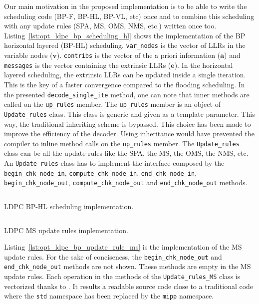 Our main motivation in the proposed implementation is to be able to write the
scheduling code (BP-F, BP-HL, BP-VL, etc) once and to combine this scheduling
with any update rules (SPA, MS, OMS, NMS, etc.) written once too.
Listing~\ref{lst:opt_ldpc_bp_scheduling_hl} shows the implementation of the
BP horizontal layered (BP-HL) scheduling. \verb|var_nodes| is the vector of
LLRs in the variable nodes ($\bm{v}$). \verb|contribs| is the vector of the a
priori information ($\bm{a}$) and \verb|messages| is the vector containing the
extrinsic LLRs ($\bm{e}$). In the horizontal layered scheduling, the
extrinsic LLRs can be updated inside a single iteration. This is the key of a
faster convergence compared to the flooding scheduling. In the presented
\verb|decode_single_ite| method, one can note that inner methods are called on
the \verb|up_rules| member. The \verb|up_rules| member is an object of
\verb|Update_rules| class. This class is generic and given as a template
parameter. This way, the traditional inheriting scheme is bypassed. This choice
has been made to improve the efficiency of the decoder. Using inheritance would
have prevented the compiler to inline method calls on the \verb|up_rules|
member. The \verb|Update_rules| class can be all the update rules like the SPA,
the MS, the OMS, the NMS, etc. An \verb|Update_rules| class has to implement the
interface composed by the \verb|begin_chk_node_in|, \verb|compute_chk_node_in|,
\verb|end_chk_node_in|, \verb|begin_chk_node_out|, \verb|compute_chk_node_out|
and \verb|end_chk_node_out| methods.

\begin{listing}[htp]
  \inputminted[frame=lines,linenos]{C++}{main/chapter3/src/ldpc/bp_scheduling_hl.cpp}
  \caption{LDPC BP-HL scheduling implementation.}
  \label{lst:opt_ldpc_bp_scheduling_hl}
\end{listing}

\begin{listing}[htp]
  \inputminted[frame=lines,linenos]{C++}{main/chapter3/src/ldpc/bp_update_rule_ms.cpp}
  \caption{LDPC MS update rules implementation.}
  \label{lst:opt_ldpc_bp_update_rule_ms}
\end{listing}

Listing~\ref{lst:opt_ldpc_bp_update_rule_ms} is the implementation of the MS
update rules. For the sake of conciseness, the \verb|begin_chk_node_out| and
\verb|end_chk_node_out| methods are not shown. These methods are empty in the
MS update rules. Each operation in the methods of the \verb|Update_rules_MS|
class is vectorized thanks to \MIPP. It results a readable source code close to
a traditional \Cxx code where the \verb|std| namespace has been replaced by the
\verb|mipp| namespace.

